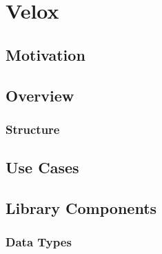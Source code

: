 \chapter{Velox}


\section{Motivation}

\section{Overview}
\subsection{Structure}
% 



\section{Use Cases}


\section{Library Components}
\subsection{Data Types}

\unfinished

